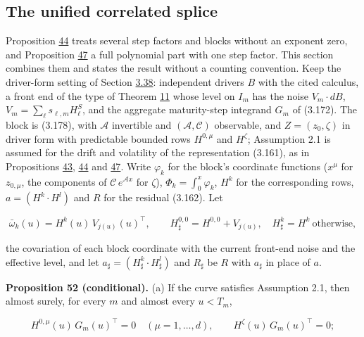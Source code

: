 \documentclass[11pt]{article}
\begin{document}
\subsection{The unified correlated splice}\label{sec:3.46}

Proposition \hyperref[res:Proposition-44]{44} treats several step factors and blocks without an exponent zero, and Proposition \hyperref[res:Proposition-47]{47} a full polynomial part with one step factor. This section combines them and states the result without a counting convention. Keep the driver-form setting of Section \hyperref[sec:3.38]{3.38}: independent drivers \(B\) with the cited calculus, a front end of the type of Theorem \hyperref[res:Theorem-11]{11} whose level on \(I_m\) has the noise \(V_m\cdot dB\), \(V_m=\sum_\ell s_{\ell,m}H^S_\ell\), and the aggregate maturity-step integrand \(G_m\) of (3.172). The block is (3.178), with \(\mathcal A\) invertible and \((\mathcal A,\mathcal C)\) observable, and \(Z=(z_0,\zeta)\) in driver form with predictable bounded rows \(H^{0,\mu}\) and \(H^\zeta\); Assumption 2.1 is assumed for the drift and volatility of the representation (3.161), as in Propositions \hyperref[res:Proposition-43]{43}, \hyperref[res:Proposition-44]{44} and \hyperref[res:Proposition-47]{47}. Write \(\varphi_k\) for the block's coordinate functions (\(x^\mu\) for \(z_{0,\mu}\), the components of \(\mathcal C\,e^{\mathcal Ax}\) for \(\zeta\)), \(\Phi_k=\int_0^x\varphi_k\), \(H^k\) for the corresponding rows, \(a=(H^k\cdot H^l)\) and \(R\) for the residual (3.162). Let

\begin{equation*}
\bar\omega_k(u)=H^k(u)\,V_{j(u)}(u)^\top,\qquad H^{0,0}_\sharp=H^{0,0}+V_{j(u)},\quad H^k_\sharp=H^k\ \text{otherwise}, \tag{3.203}\label{eq:3.203}
\end{equation*}

the covariation of each block coordinate with the current front-end noise and the effective level, and let \(a_\sharp=(H^k_\sharp\cdot H^l_\sharp)\) and \(R_\sharp\) be \(R\) with \(a_\sharp\) in place of \(a\).

\label{res:Proposition-52}
\textbf{Proposition 52 (conditional).} (a) If the curve satisfies Assumption 2.1, then almost surely, for every \(m\) and almost every \(u<T_m\),

\begin{equation*}
H^{0,\mu}(u)\,G_m(u)^\top=0\quad(\mu=1,\dots,d),\qquad H^\zeta(u)\,G_m(u)^\top=0; \tag{3.204}\label{eq:3.204}
\end{equation*}
\end{document}
